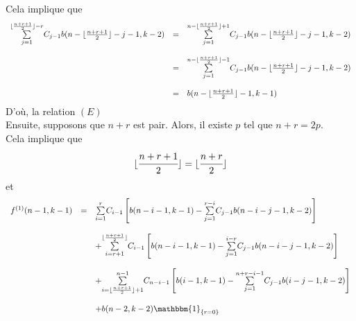Cela implique que
\[
	\begin{array}{l l l}
		\underset{j=1}{\overset{ \lfloor \frac{n+r+1}{2} \rfloor-r }{\sum}}C_{j-1}  b(n-\lfloor \frac{n+r+1}{2} \rfloor-j-1, k-2) & = & \underset{j=1}{\overset{n- \lfloor \frac{n+r+1}{2} \rfloor + 1 }{\sum}}C_{j-1}  b(n-\lfloor \frac{n+r+1}{2} \rfloor-j-1, k-2) \\ &\text{ }&\\
		                                                                                                                          & = & \underset{j=1}{\overset{n- \lfloor \frac{n+r+1}{2} \rfloor - 1 }{\sum}}C_{j-1}  b(n-\lfloor \frac{n+r+1}{2} \rfloor-j-1, k-2) \\ &\text{ }&\\
		                                                                                                                          & = & b(n-\lfloor \frac{n+r+1}{2} \rfloor-1, k-1)
	\end{array}
\]
D'où, la relation $(E)$\vspace{10pt}\\
Ensuite, supposons que $n+r$ est pair. Alors, il existe $p$ tel que $n+r=2p$.\\
Cela implique que
\[
	\lfloor \cfrac{n+r+1}{2}\rfloor = \lfloor \cfrac{n+r}{2} \rfloor
\]
et
\[
	\begin{array} {l l l}
		f^{(1)}(n-1,k-1) & =        & \underset{i=1}{\overset{r}{\sum}}C_{i-1}\left[b(n-i-1,k-1)-\underset{j=1}{\overset{r-i}{\sum}}C_{j-1}b(n-i-j-1,k-2)\right]                                     \\
		                 & \text{ } &                                                                                                                                                                \\
		                 & \text{ } & +\underset{i=r+1}{\overset{\lfloor \frac{n+r+1}{2}\rfloor }{\sum}}C_{i-1}\left[b(n-i-1,k-1)-\underset{j=1}{\overset{i-r}{\sum}}C_{j-1}b(n-i-j-1,k-2)\right]    \\
		                 & \text{ } &                                                                                                                                                                \\
		                 & \text{ } & +\underset{i=\lfloor \frac{n+r+1}{2}\rfloor+1}{\overset{n-1}{\sum}}C_{n-i-1}\left[b(i-1,k-1)-\underset{j=1}{\overset{n+r-i-1}{\sum}}C_{j-1}b(i-j-1,k-2)\right] \\
		                 & \text{ } &                                                                                                                                                                \\
		                 & \text{ } & +b(n-2,k-2)\mathbbm{1}_{\{r = 0\}}                                                                                                                             %
	\end{array}
\]
